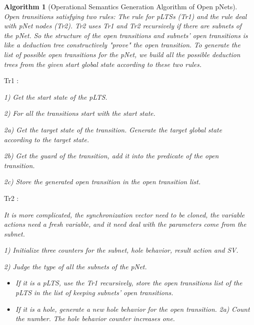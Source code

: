 \documentclass{lncs/llncs}
\newtheorem{algorithm}[theorem]{Algorithm}
\begin{document}
\begin{algorithm}[Operational Semantics Generation Algorithm of Open pNets]
Open transitions satisfying two rules:
The rule for pLTSs (Tr1) and the rule deal with pNet nodes (Tr2).
Tr2 uses Tr1 and Tr2 recursively if there are subnets of the pNet.
So the structure of the open transitions and subnets' open transitions is like a deduction tree constructively "prove" the open transition.
To generate the list of possible open transitions for the pNet, we build all the possible deduction trees from the given start global state according to these two rules.

\begin{description}
\item[{Tr1 :}]
\end{description}

1) Get the start state of the pLTS.

2) For all the transitions start with the start state.

       2a) Get the target state of the transition. Generate the target global state according to the target state.
       
       2b) Get the guard of the transition, add it into the predicate of the open transition.
       
       2c) Store the generated open transition in the open transition list.

\begin{description}
\item[{Tr2 :}]
\end{description}

It is more complicated, the synchronization vector need to be cloned, the variable actions need a fresh variable, and it need deal with the parameters come from the subnet.

1) Initialize three counters for the subnet, hole behavior, result action and SV.

2) Judge the type of all the subnets of the pNet.
	\begin{itemize}

        \item If it is a pLTS, use the Tr1 recursively, store the open transitions list of the pLTS in the list of keeping subnets' open transitions.
       
        \item If it is a hole, generate a new hole behavior for the open transition. 
           2a) Count the number. The hole behavior counter increases one.
           

\end{itemize}
\end{algorithm}
\end{document}
